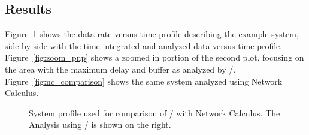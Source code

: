 \subsection{Results}

Figure~\ref{fig:system_comparison} shows the data rate versus time
profile describing the example system, side-by-side with the
time-integrated and analyzed data versus time profile.
Figure~\ref{fig:zoom_pnp} shows a zoomed in portion of the second
plot, focusing on the area with the maximum delay and buffer as
analyzed by \shorttool/.  Figure~\ref{fig:nc_comparison} shows the
same system analyzed using Network Calculus.

\begin{figure}[ht!]
  \centering
  \caption{System profile used for comparison of \shorttool/ with
    Network Calculus.  The Analysis using \shorttool/ is shown on the right.}
  \label{fig:system_comparison}
\end{figure}

